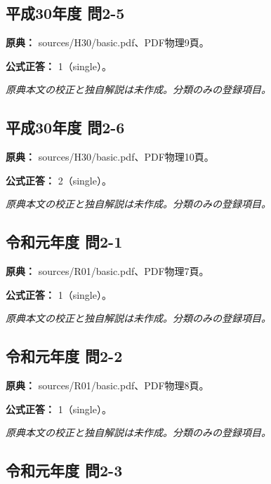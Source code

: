 \subsection{平成30年度 問2-5}
\label{q:h30-reg-basic-2-5}

\noindent\textbf{原典：} sources/H30/basic.pdf、PDF物理9頁。

\textbf{公式正答：} 1（single）。

\par\textit{原典本文の校正と独自解説は未作成。分類のみの登録項目。}

\subsection{平成30年度 問2-6}
\label{q:h30-reg-basic-2-6}

\noindent\textbf{原典：} sources/H30/basic.pdf、PDF物理10頁。

\textbf{公式正答：} 2（single）。

\par\textit{原典本文の校正と独自解説は未作成。分類のみの登録項目。}

\subsection{令和元年度 問2-1}
\label{q:r01-reg-basic-2-1}

\noindent\textbf{原典：} sources/R01/basic.pdf、PDF物理7頁。

\textbf{公式正答：} 1（single）。

\par\textit{原典本文の校正と独自解説は未作成。分類のみの登録項目。}

\subsection{令和元年度 問2-2}
\label{q:r01-reg-basic-2-2}

\noindent\textbf{原典：} sources/R01/basic.pdf、PDF物理8頁。

\textbf{公式正答：} 1（single）。

\par\textit{原典本文の校正と独自解説は未作成。分類のみの登録項目。}

\subsection{令和元年度 問2-3}
\label{q:r01-reg-basic-2-3}

